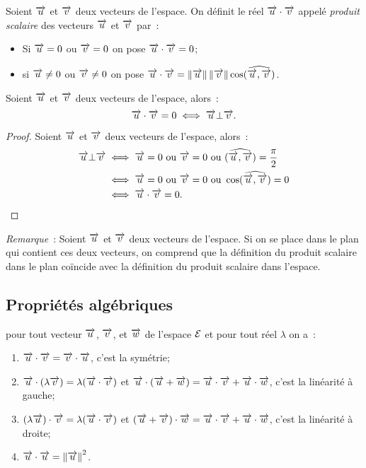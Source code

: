 \begin{defdef}
  Soient \(\vu\) et \(\vv\) deux vecteurs de l'espace. On définit le réel 
  \(\vu\cdot\vv\) appelé \emph{produit scalaire} des vecteurs \(\vu\) et \(\vv\) 
  par~:
  \begin{itemize}
    \item Si \(\vu = 0\) ou \(\vv = 0\) on pose \(\vu\cdot\vv = 0\);
    \item si \(\vu\neq 0\) ou \(\vv\neq 0\) on pose \(\vu\cdot\vv = 
      \norme{\vu}\norme{\vv}\cos(\widehat{\vu, \vv})\).
  \end{itemize}
\end{defdef}

\begin{prop}
  Soient \(\vu\) et \(\vv\) deux vecteurs de l'espace, alors~:
  \begin{equation}
    \vu\cdot\vv = 0 \iff \vu \bot \vv.
  \end{equation}
\end{prop}

\begin{proof}
  Soient \(\vu\) et \(\vv\) deux vecteurs de l'espace, alors~:
  \begin{align}
    \vu \bot \vv 
    &\iff \vu = 0 \text{~ou~} \vv = 0 \text{~ou~} (\widehat{\vu, 
    \vv})=\frac{\pi}{2}\\
    &\iff \vu = 0 \text{~ou~} \vv = 0 \text{~ou~} 
    \cos(\widehat{\vu, \vv})=0\\
    &\iff \vu\cdot\vv = 0.
  \end{align}
\end{proof}

\emph{Remarque}~: Soient \(\vu\) et \(\vv\) deux vecteurs de l'espace. Si on 
se place dans le plan qui contient ces deux vecteurs, on comprend que la 
définition du produit scalaire dans le plan coïncide avec la définition du 
produit scalaire dans l'espace.

\subsection{Propriétés algébriques}
\begin{prop}
  \label{prop:propalgprodsc}
  pour tout vecteur \(\vu\), \(\vv\), et \(\vw\) de l'espace \(\E\) et pour 
  tout réel \(\lambda\) on a~:
  \begin{enumerate}
    \item \(\vu\cdot\vv = \vv\cdot\vu\), c'est la symétrie;
    \item \(\vu\cdot(\lambda\vv) = \lambda(\vu\cdot\vv)\) et \(\vu\cdot(\vu + 
      \vw) = \vu\cdot\vv + \vu\cdot\vw\), c'est la linéarité à gauche;
    \item \((\lambda\vu)\cdot\vv = \lambda(\vu\cdot\vv)\) et \((\vu + 
      \vv)\cdot\vw = \vu\cdot\vv + \vu\cdot\vw\), c'est la linéarité à droite;
    \item \(\vu\cdot\vu = \norme{\vu}^2\).
  \end{enumerate}
\end{prop}


